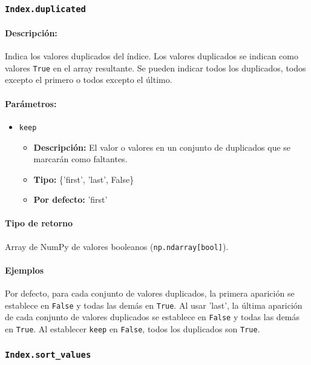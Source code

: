     \subsubsection{\texttt{Index.duplicated}}

    \paragraph{Descripción:}
    Indica los valores duplicados del índice. Los valores duplicados se indican como valores \texttt{True} en el array resultante. Se pueden indicar todos los duplicados, todos excepto el primero o todos excepto el último.

    \paragraph{Parámetros:}

    \begin{itemize}
        \item \texttt{keep}
            \begin{itemize}
                \item \textbf{Descripción:} El valor o valores en un conjunto de duplicados que se marcarán como faltantes.
                \item \textbf{Tipo:} \{'first', 'last', False\}
                \item \textbf{Por defecto:} 'first'
            \end{itemize}
    \end{itemize}

    \paragraph{Tipo de retorno}
    Array de NumPy de valores booleanos (\texttt{np.ndarray[bool]}).

    \paragraph{Ejemplos}
    Por defecto, para cada conjunto de valores duplicados, la primera aparición se establece en \texttt{False} y todas las demás en \texttt{True}. Al usar 'last', la última aparición de cada conjunto de valores duplicados se establece en \texttt{False} y todas las demás en \texttt{True}. Al establecer \texttt{keep} en \texttt{False}, todos los duplicados son \texttt{True}.



    \subsubsection{\texttt{Index.sort\_values}}

